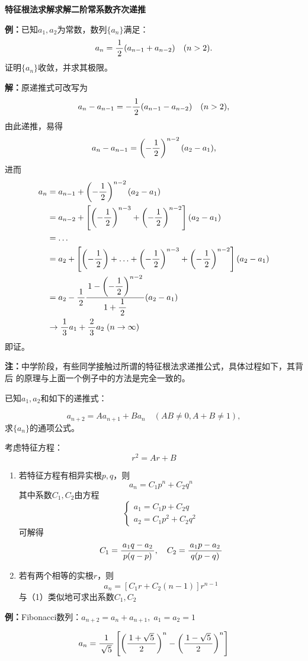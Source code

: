 \begin{shaded}
	{\bf 特征根法求解求解二阶常系数齐次递推}

	{\bf 例：}已知$a_1,a_2$为常数，数列$\{a_n\}$满足：
	$$a_n=\displaystyle\frac{\,{1}\,}{\,{2}\,}({a_{n-1}+a_{n-2}})\quad(n>2).$$
	证明$\{a_n\}$收敛，并求其极限。

	{\bf 解：}原递推式可改写为
	$$a_n-a_{n-1}=-\displaystyle\frac{\,{1}\,}{\,{2}\,}(a_{n-1}-a_{n-2})\quad(n>2),$$
	由此递推，易得
	$$a_n-a_{n-1}=\left(-\displaystyle\frac{\,{1}\,}{\,{2}\,}\right)^{n-2}(a_2-a_1),$$
	进而
	\begin{align}
		a_n&=a_{n-1}+\left(-\displaystyle\frac{\,{1}\,}{\,{2}\,}\right)^{n-2}(a_2-a_1)\notag\\
		&=a_{n-2}+\left[\left(-\displaystyle\frac{\,{1}\,}{\,{2}\,}\right)^{n-3}+\left(-\displaystyle\frac{\,{1}\,}{\,{2}\,}\right)^{n-2}\right]
		(a_2-a_1)\notag\\
		&=\ldots\notag\\
		&=a_2+\left[\left(-\displaystyle\frac{\,{1}\,}{\,{2}\,}\right)+\ldots+\left(-\displaystyle\frac{\,{1}\,}{\,{2}\,}\right)^{n-3}
		+\left(-\displaystyle\frac{\,{1}\,}{\,{2}\,}\right)^{n-2}\right](a_2-a_1)\notag\\
		&=a_2-\displaystyle\frac{\,{1}\,}{\,{2}\,}\displaystyle\frac{\,{1-\left(-\displaystyle\frac{\,{1}\,}{\,{2}\,}\right)^{n-2}}\,}{\,{1+\displaystyle\frac{\,{1}\,}{\,{2}\,}}\,}(a_2-a_1)\notag\\
		&\to\displaystyle\frac{\,{1}\,}{\,{3}\,}a_1+\displaystyle\frac{\,{2}\,}{\,{3}\,}a_2\;(n\to\infty)\notag
	\end{align}
	即证。

	{\bf 注：}中学阶段，有些同学接触过所谓的特征根法求递推公式，具体过程如下，其背后
	的原理与上面一个例子中的方法是完全一致的。

	已知$a_1,a_2$和如下的递推式：

	$$a_{n+2}=Aa_{n+1}+Ba_n\quad (AB\ne 0, A+B\ne 1),$$
	求$\{a_n\}$的通项公式。

	考虑特征方程：
	$$r^2=Ar+B$$
	\begin{enumerate}[(1)]
	  \setlength{\itemindent}{1cm}
	  \item 若特征方程有相异实根$p,q$，则
	  $$a_n=C_1p^n+C_2q^n$$
	  其中系数$C_1,C_2$由方程
	  $$\left\{\begin{array}{l}
	  a_1=C_1p+C_2q\\
	  a_2=C_1p^2+C_2q^2
	  \end{array}\right.$$
	  可解得
	  $$C_1=\displaystyle\frac{\,{a_1q-a_2}\,}{\,{p(q-p)}\,},\quad
	  C_2=\displaystyle\frac{\,{a_1p-a_2}\,}{\,{q(p-q)}\,}$$
	  \item 若有两个相等的实根$r$，则
	  $$a_n=[C_1r+C_2(n-1)]r^{n-1}$$
	  与（1）类似地可求出系数$C_1,C_2$
	\end{enumerate}

	{\bf 例：}Fibonacci数列：$a_{n+2}=a_n+a_{n+1},\;a_1=a_2=1$

	$$a_n=\displaystyle\frac{\,{1}\,}{\,{\sqrt5}\,}\left[\left(\displaystyle\frac{\,{1+\sqrt5}\,}{\,{2}\,}\right)^n
	-\left(\displaystyle\frac{\,{1-\sqrt5}\,}{\,{2}\,}\right)^n\right]$$

\end{shaded}

